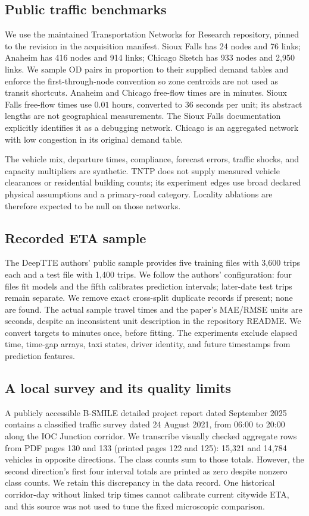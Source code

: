 \documentclass[sigconf,anonymous,review]{acmart}
\begin{document}
\subsection{Public traffic benchmarks}
We use the maintained Transportation Networks for Research repository\cite{tntp}, pinned to the revision in the acquisition manifest. Sioux Falls has 24 nodes and 76 links; Anaheim has 416 nodes and 914 links; Chicago Sketch has 933 nodes and 2,950 links. We sample OD pairs in proportion to their supplied demand tables and enforce the first-through-node convention so zone centroids are not used as transit shortcuts. Anaheim and Chicago free-flow times are in minutes. Sioux Falls free-flow times use $0.01$ hours, converted to 36 seconds per unit; its abstract lengths are not geographical measurements. The Sioux Falls documentation explicitly identifies it as a debugging network. Chicago is an aggregated network with low congestion in its original demand table.

The vehicle mix, departure times, compliance, forecast errors, traffic shocks, and capacity multipliers are synthetic. TNTP does not supply measured vehicle clearances or residential building counts; its experiment edges use broad declared physical assumptions and a primary-road category. Locality ablations are therefore expected to be null on those networks.

\subsection{Recorded ETA sample}
The DeepTTE authors' public sample provides five training files with 3,600 trips each and a test file with 1,400 trips\cite{deepttecode}. We follow the authors' configuration: four files fit models and the fifth calibrates prediction intervals; later-date test trips remain separate. We remove exact cross-split duplicate records if present; none are found. The actual sample travel times and the paper's MAE/RMSE units are seconds, despite an inconsistent unit description in the repository README. We convert targets to minutes once, before fitting. The experiments exclude elapsed time, time-gap arrays, taxi states, driver identity, and future timestamps from prediction features.

\subsection{A local survey and its quality limits}
A publicly accessible B-SMILE detailed project report dated September 2025 contains a classified traffic survey dated 24 August 2021, from 06:00 to 20:00 along the IOC Junction corridor\cite{iocsurvey}. We transcribe visually checked aggregate rows from PDF pages 130 and 133 (printed pages 122 and 125): 15,321 and 14,784 vehicles in opposite directions. The class counts sum to those totals. However, the second direction's first four interval totals are printed as zero despite nonzero class counts. We retain this discrepancy in the data record. One historical corridor-day without linked trip times cannot calibrate current citywide ETA, and this source was not used to tune the fixed microscopic comparison.
\end{document}
